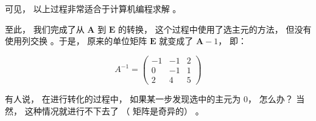 \documentclass[a4paper, 8pt]{article}
\newcommand{\matr}[1]{\mathbf{#1}}
\begin{document}
可见， 以上过程非常适合于计算机编程求解 。

	至此， 我们完成了从 $\matr{A}$ 到 $\matr{E}$ 的转换， 这个过程中使用了选主元的方法， 但没有使用列交换 。于是， 原来的单位矩阵 $\matr{E}$ 就变成了 $\matr{A}-1$， 即：

\begin{equation}
A^{-1} = \begin{pmatrix}
-1 & -1 & 2 \\
0 & -1 & 1 \\
2 & 4 & 5
\end{pmatrix}
\end{equation}

	有人说， 在进行转化的过程中， 如果某一步发现选中的主元为 $0$， 怎么办？ 当然， 这种情况就进行不下去了 （ 矩阵是奇异的） 。
\end{document}
